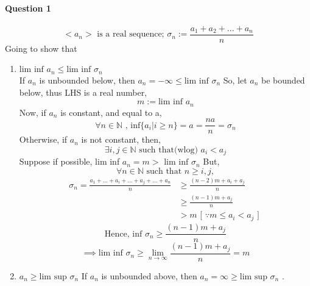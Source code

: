 \documentclass[20pt]{extarticle} %
\begin{document}
\paragraph{Question 1}
\[ <a_n>\text{ is a real sequence; }\sigma_n := \frac{a_1+a_2+...+a_n}{n} \]
Going to show that
\begin{enumerate}[label=\Roman*]
	\item $\text{lim inf } a_n \leq \text{lim inf }\sigma_n  $ \\
		If $a_n$ is unbounded below, then $a_n = -\infty \leq \text{lim inf }\sigma_n$
		So, let $a_n$ be bounded below, thus LHS is a real number,
		\[ m:= \text{lim inf }a_n \]
		Now, if $a_n$ is constant, and equal to a,
		\[ \forall n \in \mathbb{N} \text{ , inf} \{ a_i | i\geq n \} =a = \frac{na}{n} =\sigma_n\]
		Otherwise, if $a_n$ is not constant, then,
		\[ \exists i,j \in \mathbb{N} \text { such that(wlog) } a_i < a_j \]
		Suppose if possible, lim inf $a_n=m> \text{ lim inf } \sigma_n$
		But, \[ \forall n \in \mathbb{N} \text{ such that } n \geq i,j, \]
		\begin{equation*}
			\begin{split}
				\sigma_n= \frac{a_1 + ... +a_i+... + a_j + ... + a_n}{n} & \geq{\frac{(n-2)m+a_i+a_j}{n}}\\
										    & \geq \frac{(n-1)m+a_j}{n}\\
										    & >m \text{ [ $\because m \leq a_i < a_j $ ] }
			\end{split}
		\end{equation*}
		\[	\text{Hence, inf } \sigma_n \geq \frac{(n-1)m+a_j}{n} \]
		\[		\implies \text{lim inf } \sigma_n \geq \lim_{n \to \infty} \frac{(n-1)m+a_j}{n}=m\]

	\item {}$ a_n \geq \text{lim sup }\sigma_n$
		If $a_n$ is unbounded above, then $a_n =  \infty \geq \text{lim sup }\sigma_n$ .\\


\end{enumerate}
\end{document}
